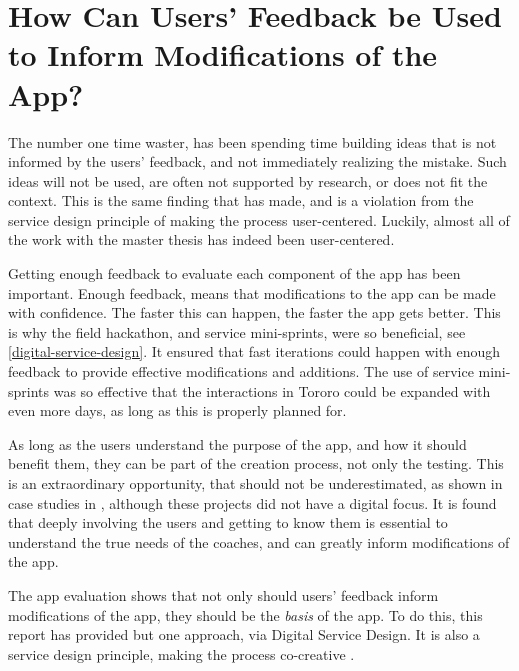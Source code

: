 
\section{How Can Users' Feedback be Used to Inform Modifications of the App?}\label{sec:user-feedback}


  The number one time waster, has been spending time building ideas that is not informed by the users' feedback, and not immediately realizing the mistake. Such ideas will not be used, are often not supported by research, or does not fit the context. This is the same finding that \cite{stickdorn} has made, and is a violation from the service design principle of making the process user-centered. Luckily, almost all of the work with the master thesis has indeed been user-centered.

  Getting enough feedback to evaluate each component of the app has been important. Enough feedback, means that modifications to the app can be made with confidence. The faster this can happen, the faster the app gets better. This is why the field hackathon, and service mini-sprints, were so beneficial, see \ref{digital-service-design}. It ensured that fast iterations could happen with enough feedback to provide effective modifications and additions. The use of service mini-sprints was so effective that the interactions in Tororo could be expanded with even more days, as long as this is properly planned for.

  As long as the users understand the purpose of the app, and how it should benefit them, they can be part of the creation process, not only the testing. This is an extraordinary opportunity, that should not be underestimated, as shown in case studies in \cite{stickdorn}, although these projects did not have a digital focus. It is found that deeply involving the users and getting to know them is essential to understand the true needs of the coaches, and can greatly inform modifications of the app.

  The app evaluation shows that not only should users' feedback inform modifications of the app, they should be the \textit{basis} of the app. To do this, this report has provided but one approach, via Digital Service Design. It is also a service design principle, making the process co-creative \cite{stickdorn}.


